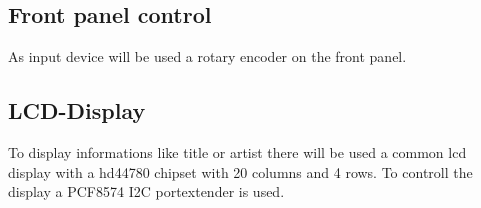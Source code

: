 \subsection{Front panel control}
As input device will be used a rotary encoder on the front panel.

\subsection{LCD-Display}
To display informations like title or artist there will be used a common lcd display with a hd44780 chipset with 20 columns and 4 rows. To controll the display a PCF8574 I2C portextender is used.
